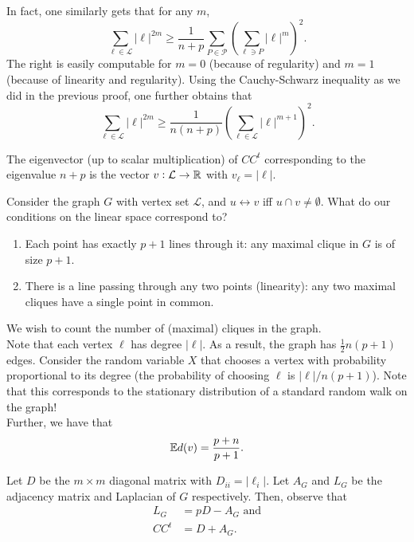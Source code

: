 \documentclass{article}
\begin{document}
	In fact, one similarly gets that for any $m$,
	\[ \sum_{\ell \in \mathcal{L}} |\ell|^{2m} \ge \frac{1}{n+p} \sum_{P \in \mathcal{P}} \left( \sum_{\ell \ni P} |\ell|^m \right)^2. \]
	The right is easily computable for $m = 0$ (because of regularity) and $m = 1$ (because of linearity and regularity).
	Using the Cauchy-Schwarz inequality as we did in the previous proof, one further obtains that
	\[ \sum_{\ell \in \mathcal{L}} |\ell|^{2m} \ge \frac{1}{n(n+p)} \left(\sum_{\ell \in \mathcal{L}} |\ell|^{m+1}\right)^2. \]
	

	\begin{porism}
		The eigenvector (up to scalar multiplication) of $CC^t$ corresponding to the eigenvalue $n+p$ is the vector $v : \mathcal{L} \to \mathbb{R}$ with $v_\ell = |\ell|$.
	\end{porism}


	Consider the graph $G$ with vertex set $\mathcal{L}$, and $u \leftrightarrow v$ iff $u \cap v \ne \emptyset$. What do our conditions on the linear space correspond to?
	\begin{enumerate}
		\item Each point has exactly $p+1$ lines through it: any maximal clique in $G$ is of size $p+1$.
		\item There is a line passing through any two points (linearity): any two maximal cliques have a single point in common.
	\end{enumerate}

	We wish to count the number of (maximal) cliques in the graph.\\
	Note that each vertex $\ell$ has degree $|\ell|$. As a result, the graph has $\frac{1}{2}n(p+1)$ edges.
	Consider the random variable $X$ that chooses a vertex with probability proportional to its degree (the probability of choosing $\ell$ is $|\ell|/n(p+1)$). Note that this corresponds to the stationary distribution of a standard random walk on the graph!\\
	Further, we have that
	\[ \mathbb{E} d(v) = \frac{p+n}{p+1}. \]

	Let $D$ be the $m \times m$ diagonal matrix with $D_{ii} = |\ell_i|$. Let $A_G$ and $L_G$ be the adjacency matrix and Laplacian of $G$ respectively. Then, observe that
	\begin{align*}
		L_G &= pD - A_G \text{ and} \\
		CC^t &= D + A_G.
	\end{align*}
	
\end{document}

